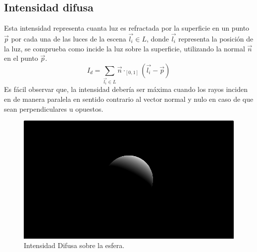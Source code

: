\subsection{Intensidad difusa}
Esta intensidad representa cuanta luz es refractada por la superficie en un punto \(\Vec{p}\) por cada una de las luces de la escena \(\Vec{l_i}\in L\), donde \(\Vec{l_i}\) representa la posición de la luz, se comprueba como incide la luz sobre la superficie, utilizando la normal \(\Vec{n}\) en el punto \(\Vec{p}\). 
\[I_d = \sum_{\Vec{l_i}\in L} \Vec{n}\cdot_{[0, 1]}(\Vec{l_i}-\Vec{p})\]
Es fácil observar que, la intensidad debería ser máxima cuando los rayos inciden en de manera paralela en sentido contrario al vector normal y nulo en caso de que sean perpendiculares u opuestos.
\begin{figure}[H]
  \centering
  \captionsetup{justification=centering}%
  \includegraphics[width=1.0\textwidth]{secciones/imagenes/lightmodel/difusa.png}
  \caption{Intensidad Difusa sobre la esfera.}
  \label{fig:difusse}
\end{figure}
